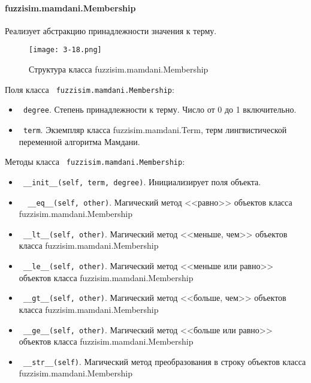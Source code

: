 \paragraph{ fuzzisim.mamdani.Membership}

Реализует абстракцию принадлежности значения к терму.

\begin{figure}[ht]
	\centering
	\texttt{[image: 3-18.png]}
	\caption{ Структура класса  fuzzisim.mamdani.Membership}
\end{figure}

Поля класса \lstinline! fuzzisim.mamdani.Membership!:
\begin{itemize}
	\item \lstinline! degree!. Степень принадлежности к терму. Число от 0 до 1 включительно.
	\item \lstinline! term!.   Экземпляр класса  fuzzisim.mamdani.Term, терм лингвистической переменной алгоритма Мамдани.
\end{itemize}


Методы класса \lstinline! fuzzisim.mamdani.Membership!:
\begin{itemize}
	\item \lstinline! __init__(self, term, degree)!. Инициализирует поля объекта.
	\item \lstinline!  __eq__(self, other)!. Магический метод <<равно>> объектов класса fuzzisim.mamdani.Membership
	\item \lstinline! __lt__(self, other)!. Магический метод <<меньше, чем>> объектов класса fuzzisim.mamdani.Membership
	\item \lstinline! __le__(self, other)!. Магический метод <<меньше или равно>> объектов класса fuzzisim.mamdani.Membership
	\item \lstinline! __gt__(self, other)!. Магический метод <<больше, чем>> объектов класса fuzzisim.mamdani.Membership
	\item \lstinline! __ge__(self, other)!. Магический метод <<больше или равно>> объектов класса fuzzisim.mamdani.Membership
	\item \lstinline! __str__(self)!. Магический метод преобразования в строку объектов класса fuzzisim.mamdani.Membership
\end{itemize}







